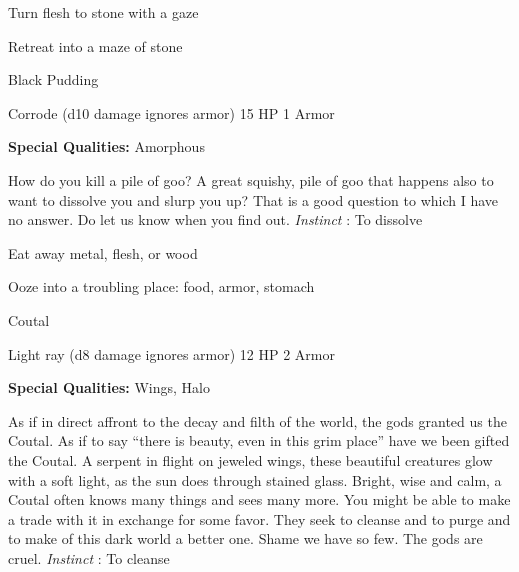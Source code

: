 \startitemize[1,packed]
         
\item Turn flesh to stone with a gaze

         
\item Retreat into a maze of stone

       
\stopitemize
       
\startMonsterName
Black Pudding	 
\stopMonsterName
       

Corrode (d10 damage ignores armor)	15 HP	1 Armor

       


       
\startMonsterQualities
         {\bf Special Qualities:}  Amorphous
\stopMonsterQualities
       
\startMonsterDescription
How do you kill a pile of goo? A great squishy, pile of goo that happens also to want to dissolve you and slurp you up? That is a good question to which I have no answer. Do let us know when you find out. {\em Instinct} : To dissolve
\stopMonsterDescription
       
\startitemize[1,packed]
         
\item Eat away metal, flesh, or wood

         
\item Ooze into a troubling place: food, armor, stomach

       
\stopitemize
       
\startMonsterName
Coutal	 
\stopMonsterName
       

Light ray (d8 damage ignores armor)	12 HP	2 Armor

       


       
\startMonsterQualities
         {\bf Special Qualities:}  Wings, Halo
\stopMonsterQualities
       
\startMonsterDescription
As if in direct affront to the decay and filth of the world, the gods granted us the Coutal. As if to say “there is beauty, even in this grim place” have we been gifted the Coutal. A serpent in flight on jeweled wings, these beautiful creatures glow with a soft light, as the sun does through stained glass. Bright, wise and calm, a Coutal often knows many things and sees many more. You might be able to make a trade with it in exchange for some favor. They seek to cleanse and to purge and to make of this dark world a better one. Shame we have so few. The gods are cruel. {\em Instinct} : To cleanse
\stopMonsterDescription
       

